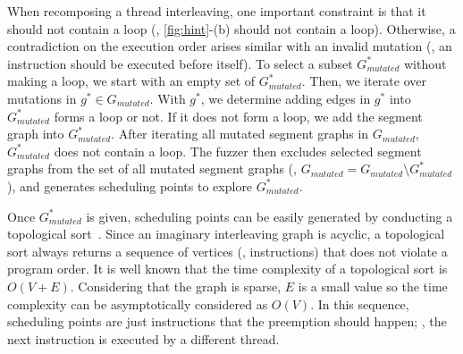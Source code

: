 When recomposing a thread interleaving, one important constraint is
that it should not contain a loop (\ie, \autoref{fig:hint}-(b) should
not contain a loop). Otherwise, a contradiction on the execution order
arises similar with an invalid mutation (\ie, an instruction should be
executed before itself).
%
To select a subset $G^*_{mutated}$ without making a loop, we start
with an empty set of $G^*_{mutated}$. Then, we iterate over mutations
in $g^* \in G_{mutated}$. With $g^*$, we determine adding edges in
$g^*$ into $G^*_{mutated}$ forms a loop or not. If it does not form a
loop, we add the segment graph into $G^*_{mutated}$.
%
After iterating all mutated segment graphs in $G_{mutated}$,
$G^*_{mutated}$ does not contain a loop. The fuzzer then excludes
selected segment graphs from the set of all mutated segment graphs
(\ie, $G_{mutated} = G_{mutated} \setminus G^*_{mutated}$), and
generates scheduling points to explore $G^*_{mutated}$.












%
Once $G^{*}_{mutated}$ is given, scheduling points can be easily
generated by conducting a topological sort~\cite{topologicalsort}.
%
Since an imaginary interleaving graph is acyclic, a topological sort
always returns a sequence of vertices (\ie, instructions) that does
not violate a program order.
%
It is well known that the time complexity of a topological sort is
$O(V+E)$. Considering that the graph is sparse, $E$ is a small value
so the time complexity can be asymptotically considered as $O(V)$.
%
In this sequence, scheduling points are just instructions that the
preemption should happen; \ie, the next instruction is executed by a
different thread.




